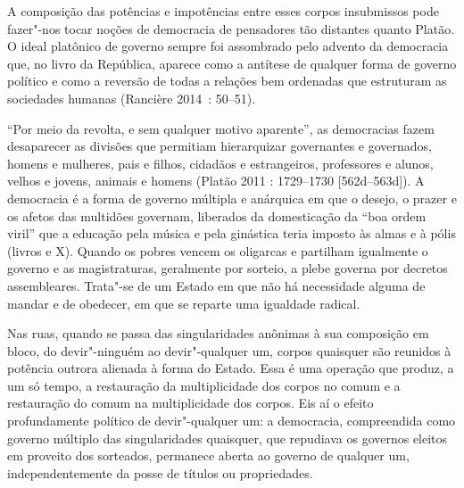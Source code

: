 A composição das potências e impotências entre esses corpos insubmissos
pode fazer"-nos tocar noções de democracia de pensadores tão distantes
quanto Platão. O ideal platônico de governo sempre foi assombrado pelo
advento da democracia que, no livro  da República, aparece como a
antítese de qualquer forma de governo político e como a reversão de
todas a relações bem ordenadas que estruturam as sociedades humanas
(Rancière 2014~: 50--51).

``Por meio da revolta, e sem qualquer motivo aparente'', as democracias
fazem desaparecer as divisões que permitiam hierarquizar governantes e
governados, homens e mulheres, pais e filhos, cidadãos e estrangeiros,
professores e alunos, velhos e jovens, animais e homens (Platão 2011 :
1729--1730 {[}562d--563d{]}). A democracia é a forma de governo múltipla e
anárquica em que o desejo, o prazer e os afetos das multidões governam,
liberados da domesticação da ``boa ordem viril'' que a educação pela
música e pela ginástica teria imposto às almas e à pólis (livros  e
X). Quando os pobres vencem os oligarcas e partilham igualmente o
governo e as magistraturas, geralmente por sorteio, a plebe governa por
decretos assembleares. Trata"-se de um Estado em que não há necessidade
alguma de mandar e de obedecer, em que se reparte uma igualdade radical.

Nas ruas, quando se passa das singularidades anônimas à sua composição
em bloco, do devir"-ninguém ao devir"-qualquer um, corpos quaisquer são
reunidos à potência outrora alienada à forma do Estado. Essa é uma
operação que produz, a um só tempo, a restauração da multiplicidade dos
corpos no comum e a restauração do comum na multiplicidade dos corpos. Eis
aí o efeito profundamente político de devir"-qualquer um: a democracia,
compreendida como governo múltiplo das singularidades quaisquer, que
repudiava os governos eleitos em proveito dos sorteados, permanece
aberta ao governo de qualquer um, independentemente da posse de títulos
ou propriedades.

